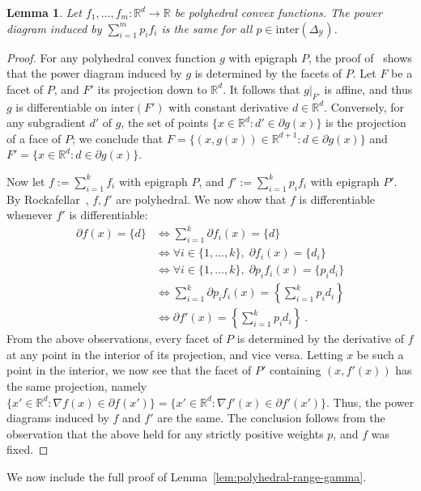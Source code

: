 \documentclass[11pt]{article}
\newcommand{\reals}{\mathbb{R}}
\newcommand{\simplex}{\Delta_\Y}
\newcommand{\Y}{\mathcal{Y}}
\newcommand{\inter}{\mathrm{inter}}
\newtheorem{lemma}{Lemma}
\begin{document}
\begin{lemma}\label{lem:polyhedral-pd-same}
	Let $f_1,\ldots,f_m:\reals^d\to\reals$ be polyhedral convex functions.
	The power diagram induced by $\sum_{i=1}^m p_i f_i$ is the same for all $p \in \inter(\simplex)$.
\end{lemma}
\begin{proof}
	For any polyhedral convex function $g$ with epigraph $P$, the proof of~\citet[Theorem 4]{aurenhammer1987power} shows that the power diagram induced by $g$ is determined by the facets of $P$.
	Let $F$ be a facet of $P$, and $F'$ its projection down to $\reals^d$.
	It follows that $g|_{F'}$ is affine, and thus $g$ is differentiable on $\inter(F')$ with constant derivative $d\in\reals^d$.
	Conversely, for any subgradient $d'$ of $g$, the set of points $\{x\in\reals^d : d'\in\partial g(x)\}$ is the projection of a face of $P$; we conclude that $F = \{(x,g(x))\in\reals^{d+1} : d\in\partial g(x)\}$ and $F' = \{x\in\reals^d : d\in\partial g(x)\}$.
	
	Now let $f := \sum_{i=1}^k f_i$ with epigraph $P$, and $f' := \sum_{i=1}^k p_i f_i$ with epigraph $P'$.
	By Rockafellar~\cite{rockafellar1997convex}, $f,f'$ are polyhedral.
	We now show that $f$ is differentiable whenever $f'$ is differentiable:
	\begin{align*}
	\partial f(x) = \{d\}
	&\iff \sum_{i=1}^k \partial f_i(x) = \{d\} \\
	&\iff \forall i\in\{1,\ldots,k\}, \; \partial f_i(x) = \{d_i\} \\
	&\iff \forall i\in\{1,\ldots,k\}, \; \partial p_i f_i(x) = \{p_id_i\} \\
	&\iff \sum_{i=1}^k \partial p_if_i(x) = \left\{\sum_{i=1}^k p_id_i\right\} \\
	&\iff \partial f'(x) = \left\{\sum_{i=1}^k p_id_i\right\}~.
	\end{align*}
	From the above observations, every facet of $P$ is determined by the derivative of $f$ at any point in the interior of its projection, and vice versa.
	Letting $x$ be such a point in the interior, we now see that the facet of $P'$ containing $(x,f'(x))$ has the same projection, namely $\{x'\in\reals^d : \nabla f(x) \in \partial f(x')\} = \{x'\in\reals^d : \nabla f'(x) \in \partial f'(x')\}$.
	Thus, the power diagrams induced by $f$ and $f'$ are the same.
	The conclusion follows from the observation that the above held for any strictly positive weights $p$, and $f$ was fixed.
\end{proof}

We now include the full proof of Lemma~\ref{lem:polyhedral-range-gamma}.
\end{document}
